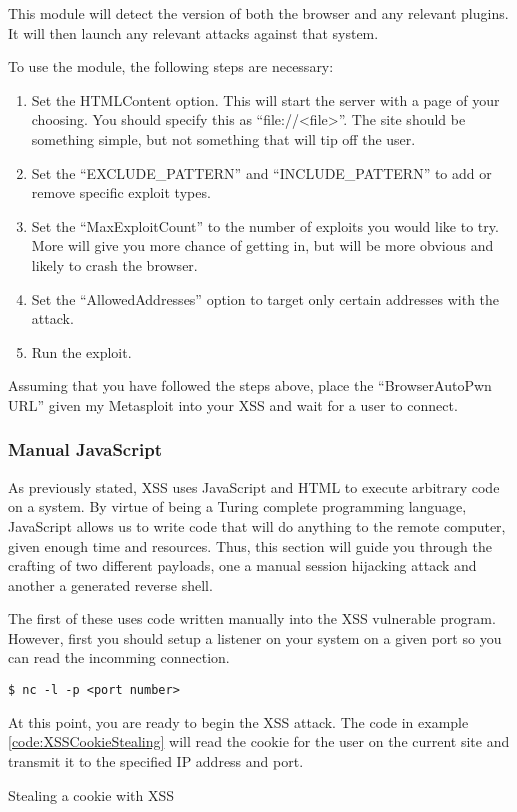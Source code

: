 				This module will detect the version of both the browser and any relevant plugins. 
				It will then launch any relevant attacks against that system. 
	
				To use the module, the following steps are necessary:
				\begin{enumerate}
					\item Set the HTMLContent option. 
						This will start the server with a page of your choosing. 
						You should specify this as ``file://<file>''.
						The site should be something simple, but not something that will tip off the user. 
					\item Set the ``EXCLUDE\_PATTERN'' and ``INCLUDE\_PATTERN'' to add or remove specific exploit types. 
					\item Set the ``MaxExploitCount'' to the number of exploits you would like to try. 
						More will give you more chance of getting in, but will be more obvious and likely to crash the browser. 
					\item Set the ``AllowedAddresses'' option to target only certain addresses with the attack. 
					\item Run the exploit. 
				\end{enumerate}

				Assuming that you have followed the steps above, place the ``BrowserAutoPwn URL'' given my Metasploit into your XSS and wait for a user to connect. 

			\subsubsection{Manual JavaScript}
				As previously stated, XSS uses JavaScript and HTML to execute arbitrary code on a system. 
				By virtue of being a Turing complete programming language, JavaScript allows us to write code that will do anything to the remote computer, given enough time and resources. 
				Thus, this section will guide you through the crafting of two different payloads, one a manual session hijacking attack and another a generated reverse shell. 

				The first of these uses code written manually into the XSS vulnerable program. 
				However, first you should setup a listener on your system on a given port so you can read the incomming connection. 
				\begin{lstlisting}[style=CLI]
					$ nc -l -p <port number>
				\end{lstlisting}

				At this point, you are ready to begin the XSS attack. 
				The code in example \ref{code:XSSCookieStealing} will read the cookie for the user on the current site and transmit it to the specified IP address and port. 
				\begin{code}
					\centering
					
					\label{code:XSSCookieStealing}
					\caption{Stealing a cookie with XSS}
				\end{code}
					
